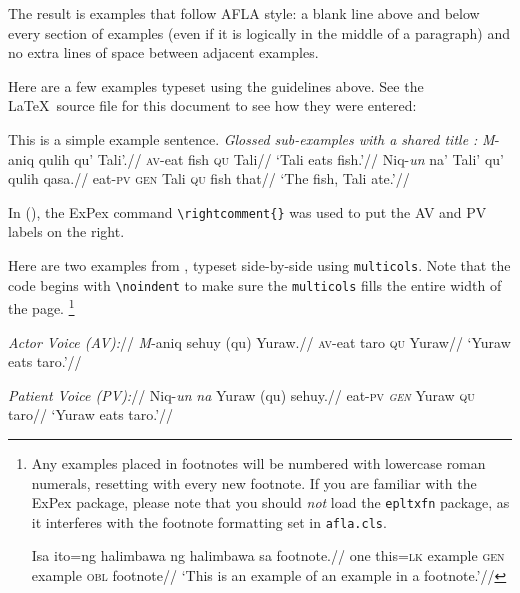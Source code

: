 \documentclass{afla}
\begin{document}
\noindent The result is examples that follow AFLA style: a blank line above and below every section of examples (even if it is logically in the middle of a paragraph) and no extra lines of space between adjacent examples.

Here are a few examples typeset using the guidelines above. See the \LaTeX\ source file for this document to see how they were entered:

\ex This is a simple example sentence.
\xe
\pex\textit{Glossed sub-examples with a shared title \citep[examples from][]{liu2004}:}
\a	\begingl
	\gla {}\textit{M}-aniq qulih qu' Tali'.//
	\glb \textsc{av}-eat fish \textsc{qu} Tali//
	\glft `Tali eats fish.'//
	\endgl
\a	\begingl
	\gla {}Niq-\textit{un} na' Tali' qu' qulih qasa.//
	\glb eat-\textsc{pv} \textsc{gen} Tali \textsc{qu} fish that//
	\glft `The fish, Tali ate.'//
	\endgl
\xe
\

In (\lastx), the ExPex command \verb`\rightcomment{}` was used to put the AV and PV labels on the right.

Here are two examples from \citealt*{voice-afla}, typeset side-by-side using \verb`multicols`. Note that the code begins with \verb`\noindent` to make sure the \verb`multicols` fills the entire width of the page.%
\footnote{%
	Any examples placed in footnotes will be numbered with lowercase roman numerals, resetting with every new footnote. If you are familiar with the ExPex package, please note that you should \emph{not} load the \texttt{epltxfn} package, as it interferes with the footnote formatting set in \texttt{afla.cls}.

	\ex \begingl
		\gla Isa ito=ng halimbawa ng halimbawa sa footnote.//
		\glb one this=\textsc{lk} example \textsc{gen} example \textsc{obl} footnote//
		\glft `This is an example of an example in a footnote.'//
		\endgl
	\xe
}

\noindent\begin{multicols}{2}
\ex \begingl
	\glpreamble\textit{\textit{Actor Voice (AV):}}//
	\gla \textit{M}-aniq sehuy (qu) Yuraw.//
	\glb \textsc{av}-eat taro \textsc{qu} Yuraw//
	\glft `Yuraw eats taro.'//
	\endgl
\xe

\columnbreak

\ex \begingl
	\glpreamble\textit{\textit{Patient Voice (PV):}}//
	\gla Niq-\textit{un} \textit{na} Yuraw (qu) sehuy.//
	\glb eat-\textsc{pv} \textit{\textsc{gen}} Yuraw \textsc{qu} taro//
	\glft `Yuraw eats taro.'//
	\endgl
\xe
\end{multicols}
\end{document}
